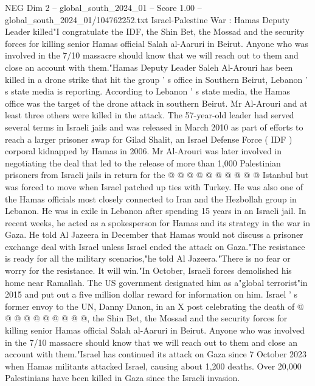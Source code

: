\begin{textsample}{NEG Dim 2 – global\_south\_2024\_01 – Score 1.00 – global\_south\_2024\_01/104762252.txt}  \label{ex:f2_neg_321}
Israel-Palestine War : Hamas Deputy Leader killed"I congratulate the IDF, the Shin Bet, the Mossad and the security forces for killing senior Hamas official Salah al-Aaruri in Beirut.
Anyone who was involved in the 7/10 massacre should know that we will reach out to them and close an account with them."Hamas Deputy Leader Saleh Al-Arouri has been killed in a drone strike that hit the group ' s office in Southern Beirut, Lebanon ' s state media is reporting.
According to Lebanon ' s state media, the Hamas office was the target of the drone attack in southern Beirut.
Mr Al-Arouri and at least three others were killed in the attack.
The 57-year-old leader had served several terms in Israeli jails and was released in March 2010 as part of efforts to reach a larger prisoner swap for Gilad Shalit, an Israel Defense Force ( IDF ) corporal kidnapped by Hamas in 2006.
Mr Al-Arouri was later involved in negotiating the deal that led to the release of more than 1,000 Palestinian prisoners from Israeli jails in return for the @ @ @ @ @ @ @ @ @ @ Istanbul but was forced to move when Israel patched up ties with Turkey.
He was also one of the Hamas officials most closely connected to Iran and the Hezbollah group in Lebanon.
He was in exile in Lebanon after spending 15 years in an Israeli jail.
In recent weeks, he acted as a spokesperson for Hamas and its strategy in the war in Gaza.
He told Al Jazeera in December that Hamas would not discuss a prisoner exchange deal with Israel unless Israel ended the attack on Gaza."The resistance is ready for all the military scenarios,"he told Al Jazeera."There is no fear or worry for the resistance.
It will win."In October, Israeli forces demolished his home near Ramallah.
The US government designated him as a"global terrorist"in 2015 and put out a five million dollar reward for information on him.
Israel ' s former envoy to the UN, Danny Danon, in an X post celebrating the death of @ @ @ @ @ @ @ @ @ @, the Shin Bet, the Mossad and the security forces for killing senior Hamas official Salah al-Aaruri in Beirut.
Anyone who was involved in the 7/10 massacre should know that we will reach out to them and close an account with them."Israel has continued its attack on Gaza since 7 October 2023 when Hamas militants attacked Israel, causing about 1,200 deaths.
Over 20,000 Palestinians have been killed in Gaza since the Israeli invasion.

\end{textsample}
